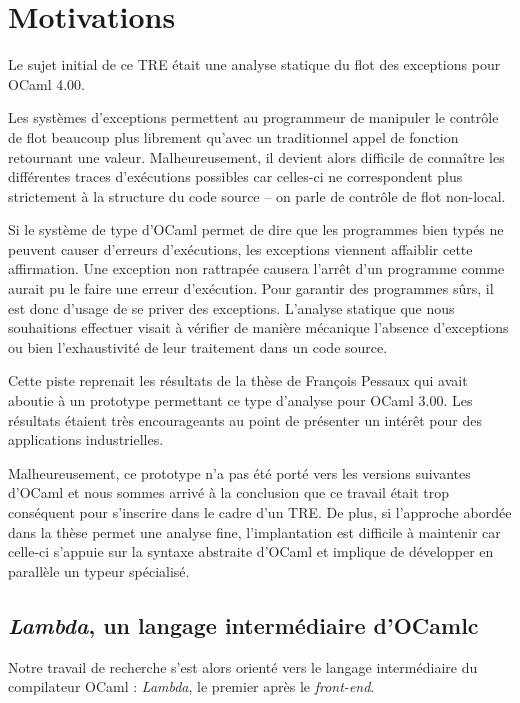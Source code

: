 \section{Motivations}

Le sujet initial de ce TRE était une analyse statique du flot des exceptions
pour OCaml 4.00. 

Les systèmes d'exceptions permettent au programmeur de manipuler le contrôle de
flot beaucoup plus librement qu'avec un traditionnel appel de fonction
retournant une valeur. Malheureusement, il devient alors difficile de connaître
les différentes traces d'exécutions possibles car celles-ci ne correspondent
plus strictement à la structure du code source -- on parle de contrôle de flot
non-local.

Si le système de type d'OCaml permet de dire que les programmes bien typés ne
peuvent causer d'erreurs d'exécutions, les exceptions viennent affaiblir cette
affirmation.  Une exception non rattrapée causera l'arrêt d'un programme comme
aurait pu le faire une erreur d'exécution.  Pour garantir des programmes sûrs,
il est donc d'usage de se priver des exceptions.  L'analyse statique que nous
souhaitions effectuer visait à vérifier de manière mécanique l'absence
d'exceptions ou bien l'exhaustivité de leur traitement dans un code source.

Cette piste reprenait les résultats de la thèse de François Pessaux
\cite{ExcAnalysis} qui avait aboutie à un prototype permettant ce type
d'analyse pour OCaml 3.00.  Les résultats étaient très encourageants au point
de présenter un intérêt pour des applications industrielles.

Malheureusement, ce prototype n'a pas été porté vers les versions suivantes
d'OCaml et nous sommes arrivé à la conclusion que ce travail était trop
conséquent pour s'inscrire dans le cadre d'un TRE.  De plus, si l'approche
abordée dans la thèse permet une analyse fine, l'implantation est difficile à
maintenir car celle-ci s'appuie sur la syntaxe abstraite d'OCaml et implique de
développer en parallèle un typeur spécialisé.

\subsection{\emph{Lambda}, un langage intermédiaire d'OCamlc}

Notre travail de recherche s'est alors orienté vers le langage intermédiaire du
compilateur OCaml : \emph{Lambda}, le premier après le \emph{front-end}.

